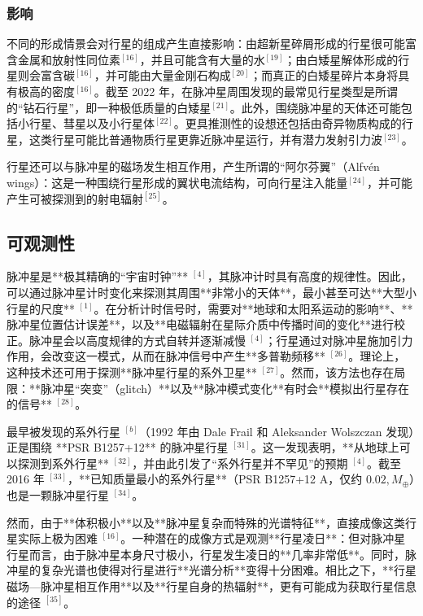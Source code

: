 \subsubsection{影响}
不同的形成情景会对行星的组成产生直接影响：由超新星碎屑形成的行星很可能富含金属和放射性同位素$^{[16]}$，并且可能含有大量的水$^{[19]}$；由白矮星解体形成的行星则会富含碳$^{[16]}$，并可能由大量金刚石构成$^{[20]}$；而真正的白矮星碎片本身将具有极高的密度$^{[16]}$。截至 2022 年，在脉冲星周围发现的最常见行星类型是所谓的“钻石行星”，即一种极低质量的白矮星$^{[21]}$。此外，围绕脉冲星的天体还可能包括小行星、彗星以及小行星体$^{[22]}$。更具推测性的设想还包括由奇异物质构成的行星，这类行星可能比普通物质行星更靠近脉冲星运行，并有潜力发射引力波$^{[23]}$。

行星还可以与脉冲星的磁场发生相互作用，产生所谓的“阿尔芬翼”（Alfvén wings）：这是一种围绕行星形成的翼状电流结构，可向行星注入能量$^{[24]}$，并可能产生可被探测到的射电辐射$^{[25]}$。
\subsection{可观测性}
脉冲星是**极其精确的“宇宙时钟”** $^{[4]}$，其脉冲计时具有高度的规律性。因此，可以通过脉冲星计时变化来探测其周围**非常小的天体**，最小甚至可达**大型小行星的尺度** $^{[1]}$。在分析计时信号时，需要对**地球和太阳系运动的影响**、**脉冲星位置估计误差**，以及**电磁辐射在星际介质中传播时间的变化**进行校正。脉冲星会以高度规律的方式自转并逐渐减慢 $^{[4]}$；行星通过对脉冲星施加引力作用，会改变这一模式，从而在脉冲信号中产生**多普勒频移** $^{[26]}$。理论上，这种技术还可用于探测**脉冲星行星的系外卫星** $^{[27]}$。然而，该方法也存在局限：**脉冲星“突变”（glitch）**以及**脉冲模式变化**有时会**模拟出行星存在的信号** $^{[28]}$。

最早被发现的系外行星 $^{[b]}$（1992 年由 Dale Frail 和 Aleksander Wolszczan 发现）正是围绕 **PSR B1257+12** 的脉冲星行星 $^{[31]}$。这一发现表明，**从地球上可以探测到系外行星** $^{[32]}$，并由此引发了“系外行星并不罕见”的预期 $^{[4]}$。截至 2016 年 $^{[33]}$，**已知质量最小的系外行星**（PSR B1257+12 A，仅约 $0.02,M_{\oplus}$）也是一颗脉冲星行星 $^{[34]}$。

然而，由于**体积极小**以及**脉冲星复杂而特殊的光谱特征**，直接成像这类行星实际上极为困难 $^{[16]}$。一种潜在的成像方式是观测**行星凌日**：但对脉冲星行星而言，由于脉冲星本身尺寸极小，行星发生凌日的**几率非常低**。同时，脉冲星的复杂光谱也使得对行星进行**光谱分析**变得十分困难。相比之下，**行星磁场—脉冲星相互作用**以及**行星自身的热辐射**，更有可能成为获取行星信息的途径 $^{[35]}$。

